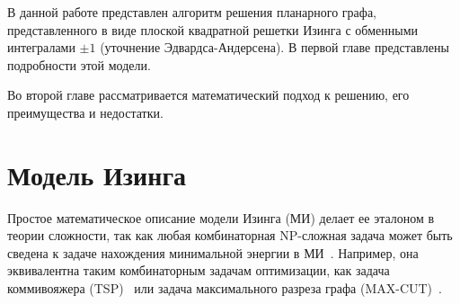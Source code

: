 \documentclass[utf8, babel, sor, jor, amsmath, amssymb, reprint]{elsarticle} %
\begin{document}
	В данной работе представлен алгоритм решения планарного графа, представленного в виде плоской квадратной решетки Изинга с обменными интегралами $\pm 1$ (уточнение Эдвардса-Андерсена). В первой главе представлены подробности этой модели.
	
	Во второй главе рассматривается математический подход к решению, его преимущества и недостатки.
	
	

	\section{Модель Изинга}
	Простое математическое описание модели Изинга (МИ) делает ее эталоном в теории сложности, так как любая комбинаторная NP-сложная задача может быть сведена к задаче нахождения минимальной энергии в МИ~\cite{Markovich2019}. Например, она эквивалентна таким комбинаторным задачам оптимизации, как задача коммивояжера (TSP)~\cite{papadimitriou1977euclidean} или задача максимального разреза графа ({}MAX-CUT)~\cite{karp2010reducibility}.
\end{document}
